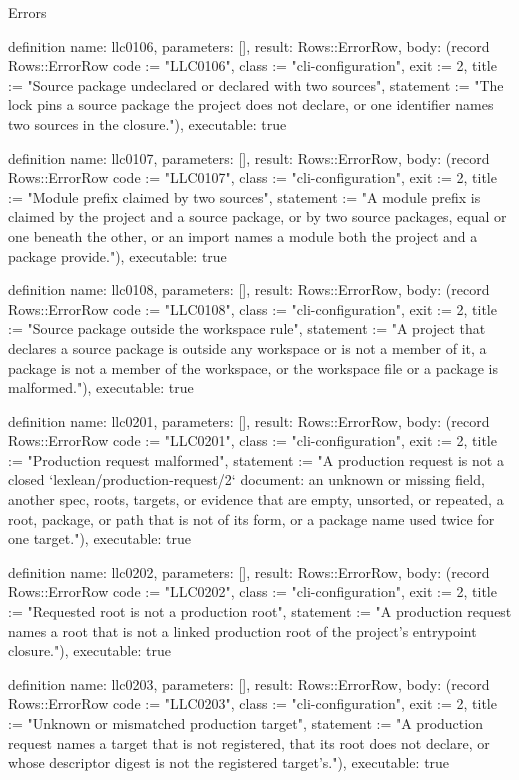 \begin{lexlean}{Errors}
\begin{semanticmodule}
definition{
  name: llc0106,
  parameters: [],
  result: Rows::ErrorRow,
  body: (record Rows::ErrorRow {code := "LLC0106", class := "cli-configuration", exit := 2, title := "Source package undeclared or declared with two sources", statement := "The lock pins a source package the project does not declare, or one identifier names two sources in the closure."}),
  executable: true
}

definition{
  name: llc0107,
  parameters: [],
  result: Rows::ErrorRow,
  body: (record Rows::ErrorRow {code := "LLC0107", class := "cli-configuration", exit := 2, title := "Module prefix claimed by two sources", statement := "A module prefix is claimed by the project and a source package, or by two source packages, equal or one beneath the other, or an import names a module both the project and a package provide."}),
  executable: true
}

definition{
  name: llc0108,
  parameters: [],
  result: Rows::ErrorRow,
  body: (record Rows::ErrorRow {code := "LLC0108", class := "cli-configuration", exit := 2, title := "Source package outside the workspace rule", statement := "A project that declares a source package is outside any workspace or is not a member of it, a package is not a member of the workspace, or the workspace file or a package is malformed."}),
  executable: true
}

definition{
  name: llc0201,
  parameters: [],
  result: Rows::ErrorRow,
  body: (record Rows::ErrorRow {code := "LLC0201", class := "cli-configuration", exit := 2, title := "Production request malformed", statement := "A production request is not a closed `lexlean/production-request/2` document: an unknown or missing field, another spec, roots, targets, or evidence that are empty, unsorted, or repeated, a root, package, or path that is not of its form, or a package name used twice for one target."}),
  executable: true
}

definition{
  name: llc0202,
  parameters: [],
  result: Rows::ErrorRow,
  body: (record Rows::ErrorRow {code := "LLC0202", class := "cli-configuration", exit := 2, title := "Requested root is not a production root", statement := "A production request names a root that is not a linked production root of the project's entrypoint closure."}),
  executable: true
}

definition{
  name: llc0203,
  parameters: [],
  result: Rows::ErrorRow,
  body: (record Rows::ErrorRow {code := "LLC0203", class := "cli-configuration", exit := 2, title := "Unknown or mismatched production target", statement := "A production request names a target that is not registered, that its root does not declare, or whose descriptor digest is not the registered target's."}),
  executable: true
}


\end{semanticmodule}
\end{lexlean}
